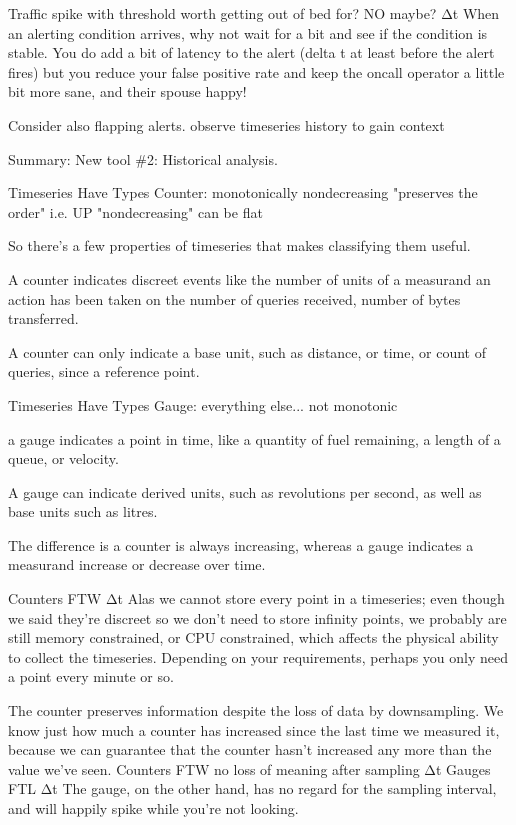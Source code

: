 \documentclass[online,12pt,helvetica]{chaksem}
\begin{document}
Traffic spike with threshold
worth getting out of bed for?
NO
maybe?
Δt
When an alerting condition arrives, why not wait for a bit and see if the condition is stable.  You do add a bit of latency to the alert (delta t at least before the alert fires) but you reduce your false positive rate and keep the oncall operator a little bit more sane, and their spouse happy!

Consider also flapping alerts.
observe timeseries history to gain context

\begin{slide}
Summary: New tool {\#}2: Historical analysis.
\end{slide}

Timeseries Have Types
Counter: monotonically nondecreasing
  "preserves the order" i.e. UP
  "nondecreasing" can be flat

So there's a few properties of timeseries that makes classifying them useful.

A counter indicates discreet events like the number of units of a measurand an action has been taken on
 the number of queries received, number of bytes transferred.


A counter can only indicate a base unit, such as distance, or time, or count of
queries, since a reference point.

Timeseries Have Types
Gauge: everything else... not monotonic


a gauge indicates a point in time, like a quantity of fuel remaining, a
length of a queue, or velocity.

A gauge can indicate derived units, such as revolutions per second, as well as
base units such as litres.


The difference is a counter is always increasing, whereas a gauge indicates a
measurand increase or decrease over time.



Counters FTW
Δt
Alas we cannot store every point in a timeseries; even though we said they're discreet so we don't need to store infinity points, we probably are still memory constrained, or CPU constrained, which affects the physical ability to collect the timeseries.  Depending on your requirements, perhaps you only need a point every minute or so.

The counter preserves information despite the loss of data by downsampling.  We know just how much a counter has increased since the last time we measured it, because we can guarantee that the counter hasn't increased any more than the value we've seen.
Counters FTW
no loss of meaning after sampling
Δt
Gauges FTL
Δt
The gauge, on the other hand, has no regard for the sampling interval, and will happily spike while you're not looking.
\end{document}
